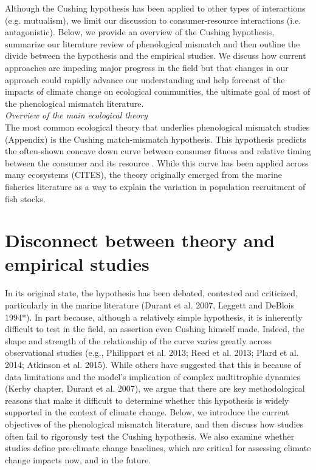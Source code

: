 \documentclass[11pt,letterpaper]{article}
\begin{document}
Although the Cushing hypothesis has been applied to other types of interactions (e.g. mutualism), we limit our discussion to consumer-resource interactions (i.e. antagonistic). Below, we provide an overview of the Cushing hypothesis, summarize our literature review of phenological mismatch and then outline the divide between the hypothesis and the empirical studies. We discuss how current approaches are impeding major progress in the field but that changes in our approach could rapidly advance our understanding and help forecast of the impacts of climate change on ecological communities, the ultimate goal of most of the phenological mismatch literature. \\

\noindent \emph{Overview of the main ecological theory}\\

The most common ecological theory that underlies phenological mismatch studies (Appendix) is the Cushing match-mismatch hypothesis. This hypothesis predicts the often-shown concave down curve between consumer fitness and relative timing between the consumer and its resource \citep[;Figure 1]{cushing1974}. While this curve has been applied across many ecosystems (CITES), the theory originally emerged from the marine fisheries literature as a way to explain the variation in population recruitment of fish stocks. 

\section{Disconnect between theory and empirical studies}
In its original state, the hypothesis has been debated, contested and criticized, particularly in the marine literature (Durant et al. 2007, Leggett and DeBlois 1994*). In part because, although a relatively simple hypothesis, it is inherently difficult to test in the field, an assertion even Cushing himself made. Indeed, the shape and strength of the relationship of the curve varies greatly across observational studies (e.g., Philippart et al. 2013; Reed et al. 2013; Plard et al. 2014; Atkinson et al. 2015). While others have suggested that this is because of data limitations and the model’s implication of complex multitrophic dynamics (Kerby chapter, Durant et al. 2007), we argue that there are key methodological reasons that make it difficult to determine whether this hypothesis is widely supported in the context of climate change. Below, we introduce the current objectives of the phenological mismatch literature, and then discuss how studies often fail to rigorously test the Cushing hypothesis. We also examine whether studies define pre-climate change baselines, which are critical for assessing climate change impacts now, and in the future.
\end{document}

